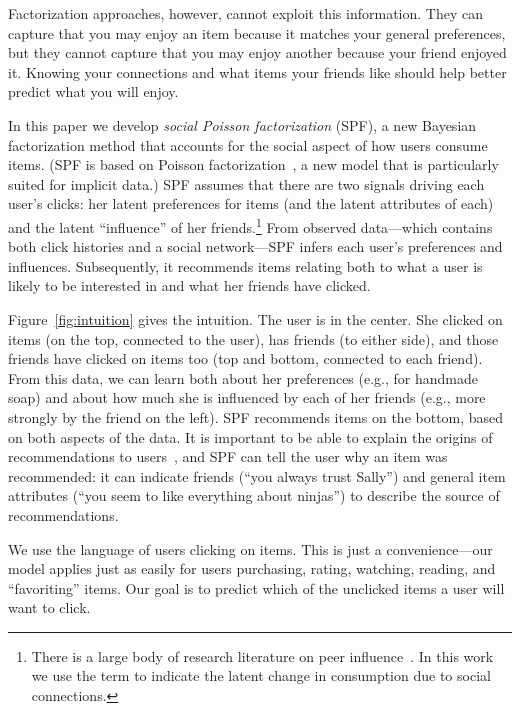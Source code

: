 \documentclass{sig-alternate-2013}
\begin{document}

Factorization approaches, however, cannot exploit this information.
They can capture that you may enjoy an item because it matches your
general preferences, but they cannot capture that you may enjoy
another because your friend enjoyed it.  Knowing your connections and
what items your friends like should help better predict what you will
enjoy.

In this paper we develop \textit{social Poisson factorization} (SPF),
a new Bayesian factorization method that accounts for the social
aspect of how users consume items.  (SPF is based on Poisson
factorization~\cite{poisMF}, a new model that is particularly suited
for implicit data.) SPF assumes that there are two signals driving
each user's clicks: her latent preferences for items (and the
latent attributes of each) and the latent ``influence'' of her
friends.\footnote{There is a large body of research literature on peer
  influence~\cite{Leskovec:2006, Crandall2008, WisdomOfCrowd}. In this
  work we use the term to indicate the latent change in consumption
  due to social connections.}  From observed data---which contains
both click histories and a social network---SPF infers each user's
preferences and influences.  Subsequently, it recommends items
relating both to what a user is likely to be interested in and what
her friends have clicked.

Figure~\ref{fig:intuition} gives the intuition. The user is in the
center.  She clicked on items (on the top, connected to the user), has
friends (to either side), and those friends have clicked on items too
(top and bottom, connected to each friend).  From this data, we can learn
both about her preferences (e.g., for handmade soap) and about how much she is
influenced by each of her friends (e.g., more strongly by the friend on the left).
SPF recommends items on the bottom, based on both aspects of the data.
It is important to be able to explain the origins of recommendations to
users~\cite{Herlocker2000}, and SPF can tell the user why an item was
recommended: it can indicate friends (``you always trust Sally'') and
general item attributes (``you seem to like everything about ninjas'') to
describe the source of recommendations.

We use the language of users clicking on items.  This is just a convenience---our
model applies just as easily for users purchasing, rating, watching, reading,
and ``favoriting'' items.  Our goal is to predict which of the
unclicked items a user will want to click.
\end{document}
